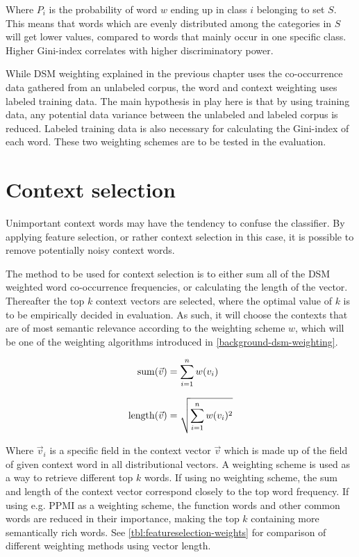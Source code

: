 Where $P_i$ is the probability of word $w$ ending up in class $i$ belonging to set $S$. This means that words which are evenly distributed among the categories in $S$ will get lower values, compared to words that mainly occur in one specific class. Higher Gini-index correlates with higher discriminatory power.

While DSM weighting explained in the previous chapter uses the co-occurrence data gathered from an unlabeled corpus, the word and context weighting uses labeled training data. The main hypothesis in play here is that by using training data, any potential data variance between the unlabeled and labeled corpus is reduced. Labeled training data is also necessary for calculating the Gini-index of each word. These two weighting schemes are to be tested in the evaluation.

\section{Context selection}\label{background-dsm-context-selection}

Unimportant context words may have the tendency to confuse the classifier. By applying feature selection, or rather context selection in this case, it is possible to remove potentially noisy context words.

The method to be used for context selection is to either sum all of the DSM weighted word co-occurrence frequencies, or calculating the length of the vector. Thereafter the top $k$ context vectors are selected, where the optimal value of $k$ is to be empirically decided in evaluation. As such, it will choose the contexts that are of most semantic relevance according to the weighting scheme $w$, which will be one of the weighting algorithms introduced in \cref{background-dsm-weighting}.

\begin{equation} \label{eq:background-context-selection}
\begin{spreadlines}{10pt}
\begin{aligned}
\mathrm{sum}(\vec{v}) &= \sum_{i=1}^n{w(v_i)} \\
\mathrm{length}(\vec{v}) &= \sqrt{\sum_{i=1}^n{w(v_i)^2}}
\end{aligned}
\end{spreadlines}
\end{equation}

Where $\vec{v}_i$ is a specific field in the context vector $\vec{v}$ which is made up of the field of given context word in all distributional vectors. A weighting scheme is used as a way to retrieve different top $k$ words. If using no weighting scheme, the sum and length of the context vector correspond closely to the top word frequency. If using e.g. PPMI as a weighting scheme, the function words and other common words are reduced in their importance, making the top $k$ containing more semantically rich words. See \cref{tbl:featureselection-weights} for  comparison of different weighting methods using vector length.

